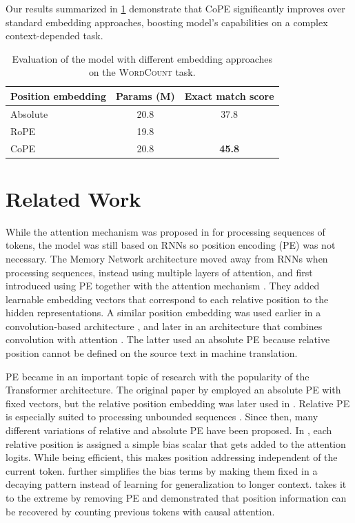 \documentclass{article}
\newcommand{\ours}{CoPE\xspace}
\begin{document}
Our results summarized in \cref{tab:wordcount} demonstrate that \ours significantly improves over standard embedding approaches, boosting model's capabilities on a complex context-depended task.

\begin{table}
  \caption{Evaluation of the model with different embedding approaches on the \textsc{WordCount} task.}
  \label{tab:wordcount}
  \centering
  \begin{tabular}{lcc}
    \toprule
    Position embedding   &  Params (M) & Exact match score     \\
    \midrule
    Absolute & 20.8 & 37.8 \\
    RoPE & 19.8 &  \\
    \ours & 20.8 & \bf 45.8 \\
    \bottomrule
  \end{tabular}
\end{table}
\fi

\section{Related Work}
While the attention mechanism 
 was proposed in \citet{Bahdanau2014NeuralMT} for processing sequences of tokens, the model was still based on RNNs so position encoding (PE) was not necessary.
The Memory Network \citep{Weston2014MemoryN}  architecture moved away from RNNs when processing sequences, instead using multiple layers of attention, and 
first introduced using PE together with the attention mechanism \citep{Sukhbaatar2015EndToEndMN}.
They added learnable embedding vectors that correspond to each relative position to the hidden representations.
A similar position embedding was used earlier in a convolution-based architecture \citep{collobert2008unified}, and later in an architecture that combines convolution with attention
\citep{gehring2017convolutional}.
The latter used an absolute PE because relative position cannot be defined on the source text in machine translation.

PE became in an important topic of research with the popularity of the Transformer architecture. The original paper by \citet{vaswani2017attention} employed an absolute PE with fixed vectors, but the relative position embedding was later used in \citet{shaw2018self}.
Relative PE is especially suited to processing unbounded sequences \citep{Dai2019TransformerXLAL}.
Since then, many different variations of relative and absolute PE have been proposed.
In \citet{raffel2020exploring}, 
each relative position is assigned a simple bias scalar that gets added to the attention logits.
While being efficient, this makes position addressing independent of the current token.
\citet{press2021train} further simplifies the bias terms by making them fixed in a decaying pattern instead of learning for generalization to longer context.
\citet{haviv2022transformer} takes it to the extreme by removing PE and demonstrated that position information can be recovered by counting previous tokens with causal attention.
\end{document}
